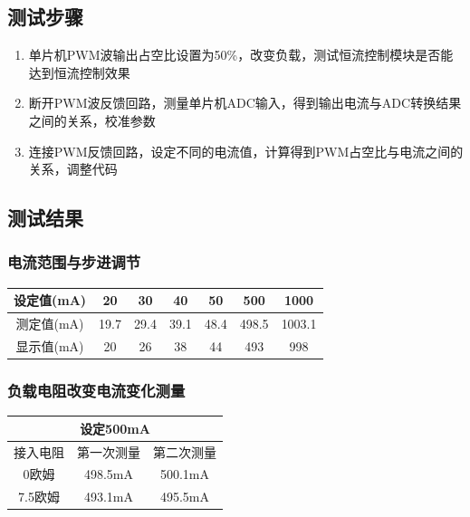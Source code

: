 \documentclass{../source/zjureport}
\begin{document}
        \subsection{测试步骤}
        \begin{enumerate}
            \item 单片机PWM波输出占空比设置为50\%，改变负载，测试恒流控制模块是否能达到恒流控制效果
            \item  断开PWM波反馈回路，测量单片机ADC输入，得到输出电流与ADC转换结果之间的关系，校准参数
            \item 连接PWM反馈回路，设定不同的电流值，计算得到PWM占空比与电流之间的关系，调整代码
        \end{enumerate}
        
        \subsection{测试结果}
            \subsubsection{电流范围与步进调节}
            \begin{table}[thp]
                \centering
                \begin{tabular}{|c|c|c|c|c|c|c|}
                \hline
                设定值(mA) & 20   & 30   & 40   & 50   & 500   & 1000   \\ \hline
                测定值(mA) & 19.7 & 29.4 & 39.1 & 48.4 & 498.5 & 1003.1 \\ \hline
                显示值(mA) & 20   & 26   & 38   & 44   & 493   & 998    \\ \hline
                \end{tabular}
                \end{table}
            \subsubsection{负载电阻改变电流变化测量}
            \begin{table}[thp]
                \centering
                \begin{tabular}{|c|c|c|}
                \hline
                \multicolumn{3}{|c|}{设定500mA} \\ \hline
                接入电阻    & 第一次测量    & 第二次测量    \\ \hline
                0欧姆     & 498.5mA  & 500.1mA  \\ \hline
                7.5欧姆   & 493.1mA  & 495.5mA  \\ \hline
                \end{tabular}
                \end{table}
\end{document}
